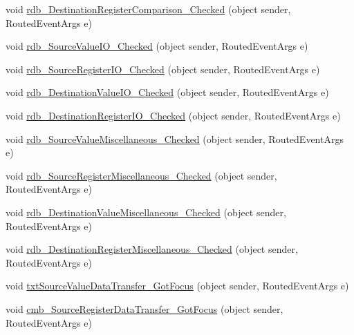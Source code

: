 \begin{DoxyCompactItemize}
\item 
void \hyperlink{class_c_p_u___o_s___simulator_1_1_instructions_window_afacc5e2bbf9eae3af4d00a65824ac22d}{rdb\+\_\+\+Destination\+Register\+Comparison\+\_\+\+Checked} (object sender, Routed\+Event\+Args e)
\item 
void \hyperlink{class_c_p_u___o_s___simulator_1_1_instructions_window_aa84c68252386686704bfc50fc0013377}{rdb\+\_\+\+Source\+Value\+I\+O\+\_\+\+Checked} (object sender, Routed\+Event\+Args e)
\item 
void \hyperlink{class_c_p_u___o_s___simulator_1_1_instructions_window_a2bb662bda02027f69c3ac5eda1131bb5}{rdb\+\_\+\+Source\+Register\+I\+O\+\_\+\+Checked} (object sender, Routed\+Event\+Args e)
\item 
void \hyperlink{class_c_p_u___o_s___simulator_1_1_instructions_window_a6b3d3a23e92def88a459a22d3b020cf7}{rdb\+\_\+\+Destination\+Value\+I\+O\+\_\+\+Checked} (object sender, Routed\+Event\+Args e)
\item 
void \hyperlink{class_c_p_u___o_s___simulator_1_1_instructions_window_a7dd3bf48ece5f6e627be01710e7efed8}{rdb\+\_\+\+Destination\+Register\+I\+O\+\_\+\+Checked} (object sender, Routed\+Event\+Args e)
\item 
void \hyperlink{class_c_p_u___o_s___simulator_1_1_instructions_window_a245dad441fcbc7e910e7f2ab6d10563c}{rdb\+\_\+\+Source\+Value\+Miscellaneous\+\_\+\+Checked} (object sender, Routed\+Event\+Args e)
\item 
void \hyperlink{class_c_p_u___o_s___simulator_1_1_instructions_window_affbdaf2f0b660f1d0a96b06bb1d038d9}{rdb\+\_\+\+Source\+Register\+Miscellaneous\+\_\+\+Checked} (object sender, Routed\+Event\+Args e)
\item 
void \hyperlink{class_c_p_u___o_s___simulator_1_1_instructions_window_a71fc15afd802fb93c7991e437ef9fd19}{rdb\+\_\+\+Destination\+Value\+Miscellaneous\+\_\+\+Checked} (object sender, Routed\+Event\+Args e)
\item 
void \hyperlink{class_c_p_u___o_s___simulator_1_1_instructions_window_a1d014230db7d7462aba012a8d61cd2f3}{rdb\+\_\+\+Destination\+Register\+Miscellaneous\+\_\+\+Checked} (object sender, Routed\+Event\+Args e)
\item 
void \hyperlink{class_c_p_u___o_s___simulator_1_1_instructions_window_ab89dd8e5416a91477aad1faa02bcbacd}{txt\+Source\+Value\+Data\+Transfer\+\_\+\+Got\+Focus} (object sender, Routed\+Event\+Args e)
\item 
void \hyperlink{class_c_p_u___o_s___simulator_1_1_instructions_window_a3435ee12d0f01d5095fa3229b4d9c972}{cmb\+\_\+\+Source\+Register\+Data\+Transfer\+\_\+\+Got\+Focus} (object sender, Routed\+Event\+Args e)

\end{DoxyCompactItemize}
